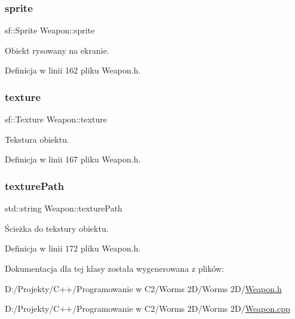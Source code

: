 \mbox{\label{class_weapon_ad56c11bff999e073bf880d482d54e06b}} 
\subsubsection{\texorpdfstring{sprite}{sprite}}
{\footnotesize\ttfamily sf\+::\+Sprite Weapon\+::sprite\hspace{0.3cm}{\ttfamily [protected]}}



Obiekt rysowany na ekranie. 



Definicja w linii 162 pliku Weapon.\+h.

\mbox{\label{class_weapon_a57095692a0468a109bba97fbd8c25db5}} 
\subsubsection{\texorpdfstring{texture}{texture}}
{\footnotesize\ttfamily sf\+::\+Texture Weapon\+::texture\hspace{0.3cm}{\ttfamily [protected]}}



Tekstura obiektu. 



Definicja w linii 167 pliku Weapon.\+h.

\mbox{\label{class_weapon_a340a6850f1bbf30d874aede653c249a9}} 
\subsubsection{\texorpdfstring{texture\+Path}{texturePath}}
{\footnotesize\ttfamily std\+::string Weapon\+::texture\+Path\hspace{0.3cm}{\ttfamily [protected]}}



Ścieżka do tekstury obiektu. 



Definicja w linii 172 pliku Weapon.\+h.



Dokumentacja dla tej klasy została wygenerowana z plików\+:\begin{DoxyCompactItemize}
\item 
D\+:/\+Projekty/\+C++/\+Programowanie w C2/\+Worms 2\+D/\+Worms 2\+D/\mbox{\hyperlink{_weapon_8h}{Weapon.\+h}}\item 
D\+:/\+Projekty/\+C++/\+Programowanie w C2/\+Worms 2\+D/\+Worms 2\+D/\mbox{\hyperlink{_weapon_8cpp}{Weapon.\+cpp}}\end{DoxyCompactItemize}
